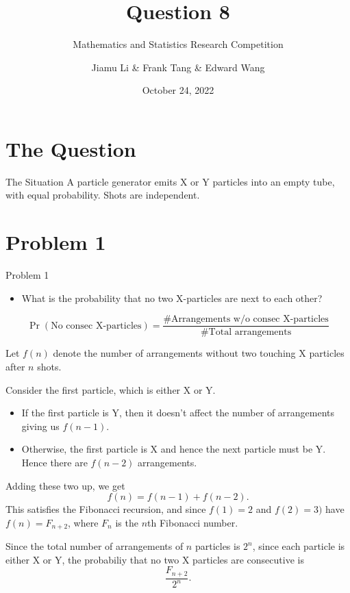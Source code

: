 \documentclass[xcolor={usenames,dvipsnames}]{beamer}
\title{Question 8}
\subtitle{Mathematics and Statistics Research Competition}
\author{Jiamu Li \& Frank Tang \& Edward Wang}
\institute{Scotch College}
\date{October 24, 2022}
\DeclareMathOperator{\prob}{Pr}
\begin{document}
\begin{frame}
  \titlepage
\end{frame}


\section{The Question}
\begin{frame}{The Situation}
  A particle generator emits X or Y particles into an empty tube, with equal probability. Shots are independent.
  \begin{center}
    
  \end{center}
\end{frame}
\section{Problem 1}
\begin{frame}{Problem 1}
\begin{itemize}
  \item What is the probability that no two X-particles are next to each other?
\end{itemize}

\begin{equation*}
  \prob(\text{No consec X-particles}) = \frac{\# \text{Arrangements w/o consec X-particles}}{\# \text{Total arrangements}}
\end{equation*}

\end{frame}

\begin{frame}
  Let $f(n)$ denote the number of arrangements without two touching X particles after  $n $ shots.
  
  Consider the first particle, which is either X or Y.
  \begin{itemize}
    \item If the first particle is Y, then it doesn't affect the number of arrangements giving us $f(n-1)$.
    \item Otherwise, the first particle is X and hence the next particle must be Y. Hence there are  $f(n-2)$ arrangements.
  \end{itemize}
\end{frame}
\begin{frame}
  Adding these two up, we get  \[
    f(n) = f(n-1) + f(n-2)
  .\] This satisfies the Fibonacci recursion, and since $f(1) = 2$ and $f(2) = 3)$ have $f(n) = F_{n+2}$, where $F_n$ is the $n$th Fibonacci number.

  Since the total number of arrangements of $n$ particles is $2^{n}$, since each particle is either X or Y, the probabiliy that no two X particles are consecutive is \[
    \frac{F_{n+2}}{2^n}
  .\] 
\end{frame}
\end{document}
